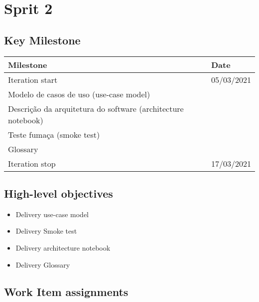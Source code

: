 \clearpage
\section{Sprit 2}

\subsection*{Key Milestone}


\begin{adjustbox}{width=\textwidth}
\noindent\begin{tabular}{|l|l|}
\hline
Milestone       & Date \\ \hline
Iteration start & 05/03/2021 \\ \hline
Modelo de casos de uso (use-case model) &      \\ \hline
Descrição da arquitetura do software (architecture notebook) &      \\ \hline
Teste fumaça (smoke test) & \\ \hline
Glossary & \\ \hline
Iteration stop  & 17/03/2021 \\ \hline
\end{tabular}
\end{adjustbox}

\subsection*{High-level objectives}


\begin{itemize}
	\item	Delivery use-case model
	\item	Delivery Smoke test
	\item	Delivery architecture notebook
	\item 	Delivery Glossary
\end{itemize}

\subsection*{Work Item assignments}


